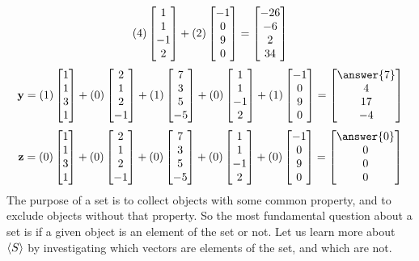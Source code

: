 \documentclass{ximera}
\begin{document}
\begin{example}
\[    (4)\begin{bmatrix}1 \\ 1 \\ -1 \\ 2\end{bmatrix}+
    (2)\begin{bmatrix}-1 \\ 0 \\ 9 \\ 0\end{bmatrix}
    =
    \begin{bmatrix}-26\\-6\\2\\34\end{bmatrix}
  \]
  \[
    \vect{y}=
    (1)\colvector{1 \\ 1 \\ 3 \\ 1}+
    (0)\colvector{2 \\ 1 \\ 2 \\ -1}+
    (1)\colvector{7 \\ 3 \\ 5 \\ -5}+
    (0)\colvector{1 \\ 1 \\ -1 \\ 2}+
    (1)\colvector{-1 \\ 0 \\ 9 \\ 0}
    =
    \colvector{\answer{7}\\4\\17\\-4}
  \]
  \[
    \vect{z}=
    (0)\colvector{1 \\ 1 \\ 3 \\ 1}+
    (0)\colvector{2 \\ 1 \\ 2 \\ -1}+
    (0)\colvector{7 \\ 3 \\ 5 \\ -5}+
    (0)\colvector{1 \\ 1 \\ -1 \\ 2}+
    (0)\colvector{-1 \\ 0 \\ 9 \\ 0}
    =
    \colvector{\answer{0}\\0\\0\\0}
  \]
  The purpose of a set is to collect objects with some common
  property, and to exclude objects without that property.  So the most
  fundamental question about a set is if a given object is an element
  of the set or not.  Let us learn more about $\left\langle S\right\rangle$ by
  investigating which vectors are elements of the set, and which are
  not.


\end{example}
\end{document}

